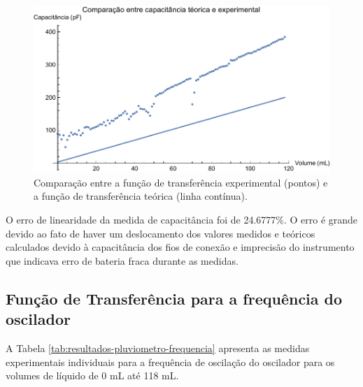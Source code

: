 \documentclass[a4paper]{instrumentacao}
\begin{document}
\begin{figure}[H]
	\centering \includegraphics[width=\textwidth]{Nivel/Experimental/Capacitancia-Comparacao.pdf}
	\caption{Comparação entre a função de transferência experimental (pontos) e a função de transferência teórica (linha contínua).}
	\label{fig:resultados-pluviometro-capacitancia-comparacao}
\end{figure}

O erro de linearidade da medida de capacitância foi de 24.6777\%. O erro é grande devido ao fato de haver um deslocamento dos valores medidos e teóricos calculados devido à capacitância dos fios de conexão e imprecisão do instrumento que indicava erro de bateria fraca durante as medidas.

\subsection{Função de Transferência para a frequência do oscilador}

A Tabela \ref{tab:resultados-pluviometro-frequencia} apresenta as medidas experimentais individuais para a frequência de oscilação do oscilador para os volumes de líquido de 0 mL até 118 mL.
\end{document}
